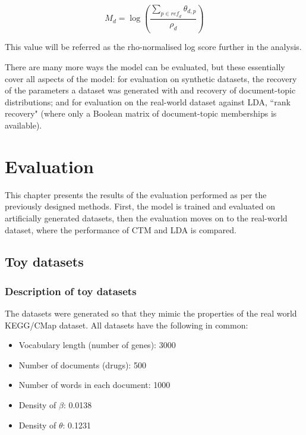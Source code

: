 \documentclass[12pt,a4paper,twoside,openright]{report}
\begin{document}
\begin{equation}\label{eq:rho-normalised-score}
M_d = \log\left(\frac{\sum\limits_{p \in \mathit{ref}_d}{\theta_{d, p}}}{\rho_d}\right)
\end{equation}

This value will be referred as the rho-normalised log score further in the analysis.


There are many more ways the model can be evaluated, but these essentially cover all aspects of the model: for evaluation on synthetic datasets, the recovery of the parameters a dataset was generated with and recovery of document-topic distributions; and for evaluation on the real-world dataset against LDA, ``rank recovery" (where only a Boolean matrix of document-topic memberships is available).

\chapter{Evaluation}

This chapter presents the results of the evaluation performed as per the previously designed methods. First, the model is trained and evaluated on artificially generated datasets, then the evaluation moves on to the real-world dataset, where the performance of CTM and LDA is compared.

\section{Toy datasets}

\subsection{Description of toy datasets}

The datasets were generated so that they mimic the properties of the real world KEGG/CMap dataset. All datasets have the following in common:

\begin{itemize}[noitemsep]
\item Vocabulary length (number of genes): 3000
\item Number of documents (drugs): 500
\item Number of words in each document: 1000
\item Density of $\beta$: 0.0138
\item Density of $\theta$: 0.1231
\end{itemize}
\end{document}
